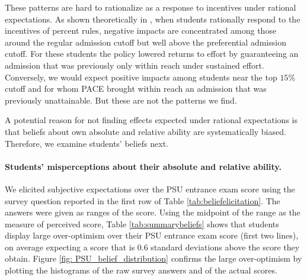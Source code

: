  
 
 

These patterns are hard to rationalize as a response to incentives under rational expectations. As shown theoretically in \citealp{bodoh2018college}, when students rationally respond to the incentives of percent rules, negative impacts are concentrated among those around the regular admission cutoff but well above the preferential admission cutoff. For these students the policy lowered returns to effort by guaranteeing an admission that was previously only within reach under sustained effort. Conversely, we would expect positive impacts among students near the top $15\%$ cutoff and for whom PACE brought within reach an admission that was previously unattainable. But these are not the patterns we find. \par  




A potential reason for not finding effects expected under rational expectations is that beliefs about own absolute and relative ability are systematically biased. Therefore, we examine students' beliefs next.\par 


 



\vspace{-10pt}


\paragraph{Students' misperceptions about their absolute and relative ability.} We elicited subjective expectations over the PSU entrance exam score using the survey question reported in the first row of Table \ref{tab:beliefelicitation}. The answers were given as ranges of the score. Using the midpoint of the range as the measure of perceived score, Table \ref{tab:summarybeliefs} shows that students display large over-optimism over their PSU entrance exam score (first two lines), on average expecting a score that is 0.6 standard deviations above the score they obtain. Figure \ref{fig: PSU_belief_distribution} confirms the large over-optimism by plotting the histograms of the raw survey answers and of the actual scores. 


